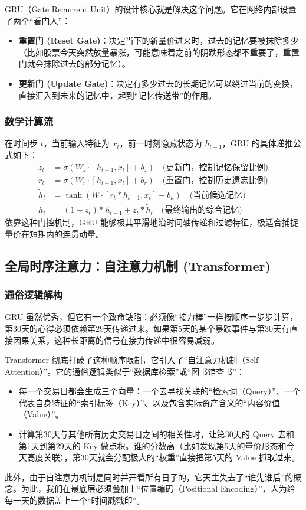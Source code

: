 \documentclass[9pt,a4paper,twoside]{rho-class/rho}
\begin{document}
    GRU（Gate Recurrent Unit）的设计核心就是解决这个问题。它在网络内部设置了两个“看门人”：
    \begin{itemize}
        \item \textbf{重置门 (Reset Gate)}：决定当下的新量价进来时，过去的记忆要被抹除多少（比如股票今天突然放量暴涨，可能意味着之前的阴跌形态都不重要了，重置门就会抹除过去的部分记忆）。
        \item \textbf{更新门 (Update Gate)}：决定有多少过去的长期记忆可以绕过当前的变换，直接汇入到未来的记忆中，起到“记忆传送带”的作用。
    \end{itemize}

    \subsubsection{数学计算流}
    在时间步 $t$，当前输入特征为 $x_t$，前一时刻隐藏状态为 $h_{t-1}$，GRU 的具体递推公式如下：
    \begin{align}
        z_t &= \sigma(W_z \cdot [h_{t-1}, x_t] + b_z) \quad \text{(更新门，控制记忆保留比例)} \\
        r_t &= \sigma(W_r \cdot [h_{t-1}, x_t] + b_r) \quad \text{(重置门，控制历史遗忘比例)} \\
        \tilde{h}_t &= \tanh(W \cdot [r_t \ast h_{t-1}, x_t] + b_h) \quad \text{(当前候选记忆)} \\
        h_t &= (1 - z_t) \ast h_{t-1} + z_t \ast \tilde{h}_t \quad \text{(最终输出的综合记忆)}
    \end{align}
    依靠这种门控机制，GRU 能够极其平滑地沿时间轴传递和过滤特征，极适合捕捉量价在短期内的连贯动量。

    \subsection{全局时序注意力：自注意力机制 (Transformer)}
    \subsubsection{通俗逻辑解构}
    GRU 虽然优秀，但它有一个致命缺陷：必须像“接力棒”一样按顺序一步步计算，第30天的心得必须依赖第29天传递过来。如果第5天的某个暴跌事件与第30天有直接因果关系，这种长距离的信号在接力传递中很容易减弱。
    
    Transformer 彻底打破了这种顺序限制，它引入了“自注意力机制（Self-Attention）”。它的通俗逻辑类似于“数据库检索”或“图书馆查书”：
    \begin{itemize}
        \item 每一个交易日都会生成三个向量：一个去寻找关联的“检索词（Query）”、一个代表自身特征的“索引标签（Key）”、以及包含实际资产含义的“内容价值（Value）”。
        \item 计算第30天与其他所有历史交易日之间的相关性时，让第30天的 Query 去和第1天到第29天的 Key 做点积。谁的分数高（比如发现第5天的量价形态和今天高度关联），第30天就会分配极大的“权重”直接把第5天的 Value 抓取过来。
    \end{itemize}
    此外，由于自注意力机制是同时并开看所有日子的，它天生失去了“谁先谁后”的概念。为此，我们在最底层必须叠加上“位置编码（Positional Encoding）”，人为给每一天的数据盖上一个“时间戳戳印”。
\end{document}
